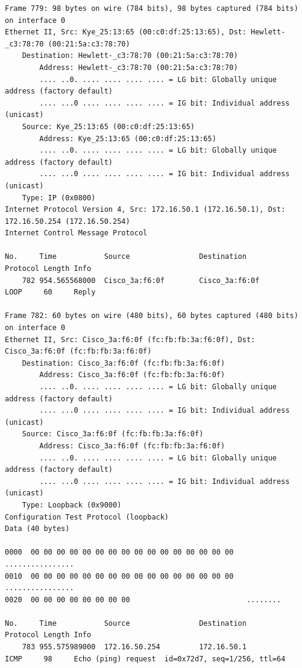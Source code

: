 \documentclass[a4paper,11pt]{article}
\begin{document}
\begin{lstlisting}
Frame 779: 98 bytes on wire (784 bits), 98 bytes captured (784 bits) on interface 0
Ethernet II, Src: Kye_25:13:65 (00:c0:df:25:13:65), Dst: Hewlett-_c3:78:70 (00:21:5a:c3:78:70)
    Destination: Hewlett-_c3:78:70 (00:21:5a:c3:78:70)
        Address: Hewlett-_c3:78:70 (00:21:5a:c3:78:70)
        .... ..0. .... .... .... .... = LG bit: Globally unique address (factory default)
        .... ...0 .... .... .... .... = IG bit: Individual address (unicast)
    Source: Kye_25:13:65 (00:c0:df:25:13:65)
        Address: Kye_25:13:65 (00:c0:df:25:13:65)
        .... ..0. .... .... .... .... = LG bit: Globally unique address (factory default)
        .... ...0 .... .... .... .... = IG bit: Individual address (unicast)
    Type: IP (0x0800)
Internet Protocol Version 4, Src: 172.16.50.1 (172.16.50.1), Dst: 172.16.50.254 (172.16.50.254)
Internet Control Message Protocol

No.     Time           Source                Destination           Protocol Length Info
    782 954.565568000  Cisco_3a:f6:0f        Cisco_3a:f6:0f        LOOP     60     Reply

Frame 782: 60 bytes on wire (480 bits), 60 bytes captured (480 bits) on interface 0
Ethernet II, Src: Cisco_3a:f6:0f (fc:fb:fb:3a:f6:0f), Dst: Cisco_3a:f6:0f (fc:fb:fb:3a:f6:0f)
    Destination: Cisco_3a:f6:0f (fc:fb:fb:3a:f6:0f)
        Address: Cisco_3a:f6:0f (fc:fb:fb:3a:f6:0f)
        .... ..0. .... .... .... .... = LG bit: Globally unique address (factory default)
        .... ...0 .... .... .... .... = IG bit: Individual address (unicast)
    Source: Cisco_3a:f6:0f (fc:fb:fb:3a:f6:0f)
        Address: Cisco_3a:f6:0f (fc:fb:fb:3a:f6:0f)
        .... ..0. .... .... .... .... = LG bit: Globally unique address (factory default)
        .... ...0 .... .... .... .... = IG bit: Individual address (unicast)
    Type: Loopback (0x9000)
Configuration Test Protocol (loopback)
Data (40 bytes)

0000  00 00 00 00 00 00 00 00 00 00 00 00 00 00 00 00   ................
0010  00 00 00 00 00 00 00 00 00 00 00 00 00 00 00 00   ................
0020  00 00 00 00 00 00 00 00                           ........

No.     Time           Source                Destination           Protocol Length Info
    783 955.575989000  172.16.50.254         172.16.50.1           ICMP     98     Echo (ping) request  id=0x72d7, seq=1/256, ttl=64


\end{lstlisting}
\end{document}
